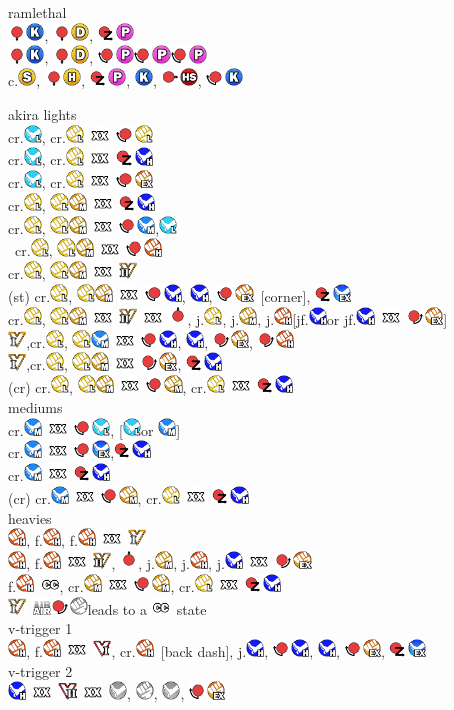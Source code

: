 \documentclass[a4paper]{article}
\newcommand{\dragonpunch}{\includegraphics[height=1.3em]{dp}}
\newcommand{\qcf}{\includegraphics[height=1.3em]{qcf}}
\newcommand{\qcb}{\includegraphics[height=1.3em]{qcb}}
\newcommand{\up}{\includegraphics[height=1.3em]{up}}
\newcommand{\down}{\includegraphics[height=1.3em]{down}}
\newcommand{\forward}{\includegraphics[height=1.3em]{forward}}
\newcommand{\anypunch}{\includegraphics[height=1.3em]{punch}}
\newcommand{\lpunch}{\includegraphics[height=1.3em]{lpunch}}
\newcommand{\mpunch}{\includegraphics[height=1.3em]{mpunch}}
\newcommand{\hpunch}{\includegraphics[height=1.3em]{hpunch}}
\newcommand{\expunch}{\includegraphics[height=1.3em]{expunch}}
\newcommand{\anykick}{\includegraphics[height=1.3em]{kick}}
\newcommand{\lkick}{\includegraphics[height=1.3em]{lkick}}
\newcommand{\mkick}{\includegraphics[height=1.3em]{mkick}}
\newcommand{\hkick}{\includegraphics[height=1.3em]{hkick}}
\newcommand{\exkick}{\includegraphics[height=1.3em]{exkick}}
\newcommand{\btnp}{\includegraphics[height=1.3em]{arc-punch}}
\newcommand{\btnk}{\includegraphics[height=1.3em]{arc-kick}}
\newcommand{\btns}{\includegraphics[height=1.3em]{slash}}
\newcommand{\btnhs}{\includegraphics[height=1.3em]{hslash}}
\newcommand{\dust}{\includegraphics[height=1.3em]{dust}}
\newcommand{\btnd}{\dust}
\newcommand{\btnh}{\includegraphics[height=1.3em]{heavy}}
\newcommand{\vsone}{\includegraphics[height=1.3em]{vskill1}}
\newcommand{\vstwo}{\includegraphics[height=1.3em]{vskill2}}
\newcommand{\vtone}{\includegraphics[height=1.3em]{vtrigger1}}
\newcommand{\vttwo}{\includegraphics[height=1.3em]{vtrigger2}}
\newcommand{\cancel}{\ \includegraphics[height=1.3em]{cancel}\ }
\newcommand{\crush}{\includegraphics[height=1.3em]{crush}}
\newcommand{\air}{\ \includegraphics[height=1.3em]{air}}
\begin{document}
\sffamily

\noindent
ramlethal \\
\down\btnk, \down\btnd, \dragonpunch\btnp \\
\down\btnk, \down\btnd, \qcb\btnp\qcb\btnp\qcb\btnp \\
c.\btns, \down\btnh, \dragonpunch\btnp, \btnk, \forward\btnhs, \qcb\btnk

\smallbreak
\noindent
akira lights \\
cr.\lkick, cr.\lpunch\cancel\qcb\lpunch \\
cr.\lkick, cr.\lpunch\cancel\dragonpunch\hkick \\
cr.\lkick, cr.\lpunch\cancel\qcb\expunch \\
cr.\lpunch, \lpunch\mpunch\cancel\dragonpunch\hkick \\
cr.\lpunch, \lpunch\mpunch\cancel\qcb\mkick,\lkick \\\
cr.\lpunch, \lpunch\mpunch\cancel\qcb\hpunch \\
cr.\lpunch, \lpunch\mpunch\cancel\vstwo \\
(st) cr.\lpunch, \lpunch\mpunch\cancel\qcb\hkick, \hkick, \qcb\expunch\ [corner], \dragonpunch\exkick \\
cr.\lpunch, \lpunch\mpunch\cancel\vstwo\cancel\up, j.\lpunch, j.\mpunch, j.\hpunch [jf.\hkick or jf.\hkick\cancel\qcf\expunch] \\
\vsone,cr.\lpunch, \lpunch\mkick\cancel\qcb\hkick, \hkick, \qcf\expunch, \qcf\hpunch \\
\vsone,cr.\lpunch, \lpunch\mpunch\cancel\qcf\expunch, \dragonpunch\hkick \\
(cr) cr.\lpunch, \lpunch\mpunch\cancel\qcb\mpunch, cr.\lpunch\cancel\dragonpunch\hkick \\

\smallbreak
\noindent
mediums \\
cr.\mkick\cancel\qcb\lkick, [\lkick or \mkick] \\
cr.\mkick\cancel\qcb\exkick,\dragonpunch\hkick \\
cr.\mkick\cancel\dragonpunch\hkick \\
(cr) cr.\mkick\cancel\qcb\mpunch, cr.\lpunch\cancel\dragonpunch\hkick \\

\smallbreak
\noindent
heavies \\
\hpunch, f.\hpunch, f.\hpunch\cancel\vsone \\
\hpunch, f.\hpunch\cancel\vstwo, \up, j.\mpunch, j.\hpunch, j.\hkick\cancel\qcf\expunch \\
f.\hpunch\ \crush, cr.\mpunch\cancel\qcb\mpunch, cr.\lpunch\cancel\dragonpunch\hkick \\
\vsone\air\qcf\anypunch leads to a \crush\ state \\

\smallbreak
\noindent
v-trigger 1 \\
\hpunch, f.\hpunch\cancel\vtone, cr.\hpunch\ [back dash], j.\hkick, \qcb\hkick, \hkick, \qcb\expunch, \dragonpunch\exkick \\
v-trigger 2 \\
\hkick\cancel\vttwo\cancel\anykick, \anypunch, \anykick, \qcb\expunch \\
\end{document}
